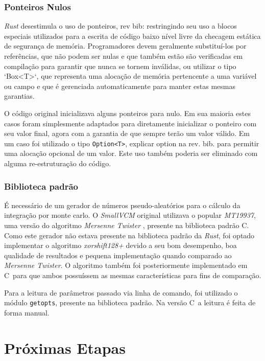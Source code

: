 \documentclass[tg]{mdtufsm}
\def\Cpp{{C\nolinebreak[4]\raisebox{.20ex}{\small\bf++}}}
\newcommand{\todo}[1]{\textsf{\color{red}#1}}
\begin{document}
\subsection{Ponteiros Nulos}

\emph{Rust} desestimula o uso de ponteiros, \todo{rev bib: restringindo seu uso a blocos especiais utilizados para a escrita de código baixo nível livre da checagem estática de segurança de memória.} Programadores devem geralmente substituí-los por referências, que não podem ser nulas e que também estão são verificadas em compilação para garantir que nunca se tornem inválidas, ou utilizar o tipo `Box<T>`, que representa uma alocação de memória pertencente a uma variável ou campo e que é gerenciada automaticamente para manter estas mesmas garantias.

O código original inicializava alguns ponteiros para nulo. Em sua maioria estes casos foram simplesmente adaptados para diretamente inicializar o ponteiro com seu valor final, agora com a garantia de que sempre terão um valor válido. Em um caso foi utilizado o tipo \texttt{Option<T>}, \todo{explicar option na rev. bib.} para permitir uma alocação opcional de um valor. Este uso também poderia ser eliminado com alguma re-estruturação do código.

\subsection{Biblioteca padrão}

É necessário de um gerador de números pseudo-aleatórios para o cálculo da integração por monte carlo. O \emph{SmallVCM} original utilizava o popular \emph{MT19937}, uma versão do algoritmo \emph{Mersenne Twister} \citep{matsumoto1998}, presente na biblioteca padrão \Cpp. Como este gerador não estava presente na biblioteca padrão da \emph{Rust}, foi optado implementar o algoritmo \emph{xorshift128+} \citep{vigna2014} devido a seu bom desempenho, boa qualidade de resultados e pequena implementação quando comparado ao \emph{Mersenne Twister}. O algoritmo também foi posteriormente implementado em \Cpp\ para que ambos possuíssem as mesmas características para fins de comparação.

Para a leitura de parâmetros passado via linha de comando, foi utilizado o módulo \texttt{getopts}, presente na biblioteca padrão. Na versão \Cpp\ a leitura é feita de forma manual.

\chapter{Próximas Etapas}
\end{document}
